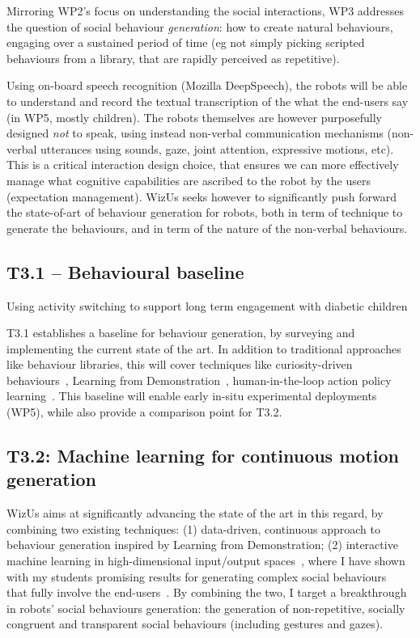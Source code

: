 \documentclass[11pt,a4paper]{report}
\newcommand{\project}{WizUs\xspace}
\begin{document}
Mirroring WP2's focus on understanding the social interactions, WP3 addresses the
question of social behaviour \emph{generation}: how to create natural
behaviours, engaging over a sustained period of time (eg not simply picking
scripted behaviours from a library, that are rapidly perceived as repetitive).

Using on-board speech recognition (Mozilla DeepSpeech), the robots will be able to understand and
record the textual transcription of the what the end-users say (in WP5, mostly
children). The robots themselves are however purposefully designed \emph{not} to
speak, using instead non-verbal communication mechanisms (non-verbal utterances
using sounds, gaze, joint attention, expressive motions, etc). This is a
critical interaction design choice, that ensures we can more effectively manage
what cognitive capabilities are ascribed to the robot by the users (expectation
management).  \project seeks however to significantly push forward the
state-of-art of behaviour generation for robots, both in term of technique to
generate the behaviours, and in term of the nature of the non-verbal behaviours.


\subsection{T3.1 -- Behavioural baseline}


Using activity switching to support long term engagement with diabetic children~\cite{coninx2016towards}

T3.1 establishes a baseline for behaviour
generation, by surveying and implementing the current state of the art. In
addition to traditional approaches like behaviour libraries, this will cover
techniques like curiosity-driven behaviours~\cite{oudeyer2005playground},
Learning from Demonstration~\cite{billard2008robot, argall2009survey},
human-in-the-loop action policy learning~\cite{senft2016sparc,
senft2019teaching}. This baseline will enable early in-situ experimental
deployments (WP5), while also provide a comparison point for T3.2.

\subsection{T3.2: Machine learning for continuous motion generation}

\project aims
at significantly advancing the state of the art in this regard, by combining two
existing techniques: (1) data-driven, continuous approach to behaviour
generation inspired by Learning from Demonstration; (2) interactive machine
learning in high-dimensional input/output spaces~\cite{senft2020woz}, where I
have shown with my students promising results for generating complex social
behaviours~\cite{senft2019teaching, winkle2020couch} that fully involve the
end-users~\cite{winkle2018social}.  By combining the two, I target
a breakthrough in robots' social behaviours generation: the generation of
non-repetitive, socially congruent and transparent social behaviours (including
gestures and gazes).
\end{document}
